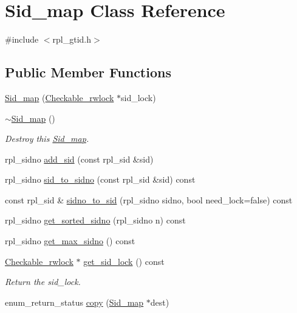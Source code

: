 \hypertarget{classSid__map}{}\section{Sid\+\_\+map Class Reference}
\label{classSid__map}


{\ttfamily \#include $<$rpl\+\_\+gtid.\+h$>$}

\subsection*{Public Member Functions}
\begin{DoxyCompactItemize}
\item 
\mbox{\hyperlink{classSid__map_adcb420a3241258cc68ab42910133144d}{Sid\+\_\+map}} (\mbox{\hyperlink{classCheckable__rwlock}{Checkable\+\_\+rwlock}} $\ast$sid\+\_\+lock)
\item 
\mbox{\label{classSid__map_a02ebe48caba52d2bccd668088c25a8e8}} 
\mbox{\hyperlink{classSid__map_a02ebe48caba52d2bccd668088c25a8e8}{$\sim$\+Sid\+\_\+map}} ()
\begin{DoxyCompactList}\small\item\em Destroy this \mbox{\hyperlink{classSid__map}{Sid\+\_\+map}}. \end{DoxyCompactList}\item 
rpl\+\_\+sidno \mbox{\hyperlink{classSid__map_a23aa9c0f385a44772e9e5c3955cca0cf}{add\+\_\+sid}} (const rpl\+\_\+sid \&sid)
\item 
rpl\+\_\+sidno \mbox{\hyperlink{classSid__map_a1667fd040c720d4ab8c35871f63926f4}{sid\+\_\+to\+\_\+sidno}} (const rpl\+\_\+sid \&sid) const
\item 
const rpl\+\_\+sid \& \mbox{\hyperlink{classSid__map_ae9a138fb42883743ec9548a6e65a56f8}{sidno\+\_\+to\+\_\+sid}} (rpl\+\_\+sidno sidno, bool need\+\_\+lock=false) const
\item 
rpl\+\_\+sidno \mbox{\hyperlink{classSid__map_a136025a5e9fb2ea21eb4da9d44060fce}{get\+\_\+sorted\+\_\+sidno}} (rpl\+\_\+sidno n) const
\item 
rpl\+\_\+sidno \mbox{\hyperlink{classSid__map_a4e1dbe6bf6fbaf1d6c3199cd407a620c}{get\+\_\+max\+\_\+sidno}} () const
\item 
\mbox{\label{classSid__map_ae8a930508aff1669dabea328064ada55}} 
\mbox{\hyperlink{classCheckable__rwlock}{Checkable\+\_\+rwlock}} $\ast$ \mbox{\hyperlink{classSid__map_ae8a930508aff1669dabea328064ada55}{get\+\_\+sid\+\_\+lock}} () const
\begin{DoxyCompactList}\small\item\em Return the sid\+\_\+lock. \end{DoxyCompactList}\item 
enum\+\_\+return\+\_\+status \mbox{\hyperlink{classSid__map_aa02acc6896576b6a7f54fb55c1e359cd}{copy}} (\mbox{\hyperlink{classSid__map}{Sid\+\_\+map}} $\ast$dest)
\end{DoxyCompactItemize}


